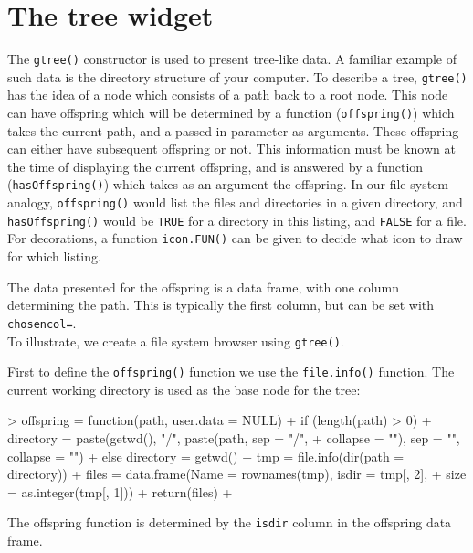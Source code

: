 \documentclass[12pt]{article}
\newcommand{\RCode}[1]{\texttt{#1}}
\newcommand{\RFunc}[1]{\texttt{#1()}}
\newcommand{\RArg}[1]{\texttt{#1=}}
\begin{document}
\section{The tree widget}

The \RFunc{gtree} constructor is used to present tree-like data. A
familiar example of such data is the directory structure of your
computer. To describe a tree, \RFunc{gtree} has the idea of a node
which consists of a path back to a root node. This node can have
offspring which will be determined by a function (\RFunc{offspring})
which takes the current path, and a passed in parameter as
arguments. These offspring can either have subsequent offspring or
not. This information must be known at the time of displaying the current
offspring, and is answered by a function (\RFunc{hasOffspring}) which
takes as an argument the offspring. In our file-system  analogy, \RFunc{offspring}
would list the files and directories in a given directory, and
\RFunc{hasOffspring} would be \RCode{TRUE} for a directory in this
listing, and \RCode{FALSE} for a file. For decorations, a function
\RFunc{icon.FUN} can be given to decide what icon to draw for which
listing.

The data presented for the offspring is a data frame, with one column
determining the path. This is typically the first column, but can be
set with \RArg{chosencol}.
\\


To illustrate, we create a file system browser using
\RFunc{gtree}.

First to define the \RFunc{offspring} function we use the
\RFunc{file.info} function. The current working directory is used as
the base node for the tree:

\begin{Schunk}
\begin{Sinput}
> offspring = function(path, user.data = NULL) {
+     if (length(path) > 0) 
+         directory = paste(getwd(), "/", paste(path, sep = "/", 
+             collapse = ""), sep = "", collapse = "")
+     else directory = getwd()
+     tmp = file.info(dir(path = directory))
+     files = data.frame(Name = rownames(tmp), isdir = tmp[, 2], 
+         size = as.integer(tmp[, 1]))
+     return(files)
+ }
\end{Sinput}
\end{Schunk}

The offspring function is determined by the \RCode{isdir} column in
the offspring data frame. 
\begin{Schunk}
\end{Schunk}
\end{document}
